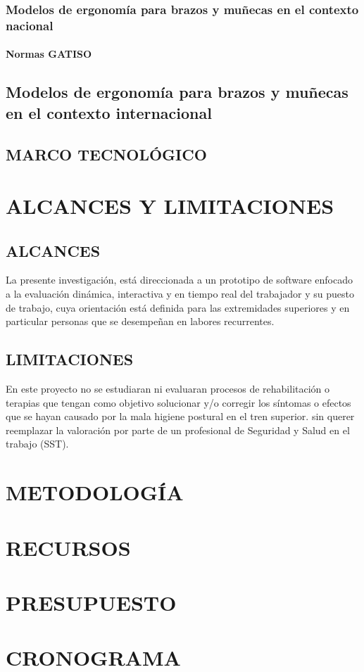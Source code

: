 \subsection{Modelos de ergonomía para brazos y muñecas en el contexto nacional}
\subsubsection{Normas GATISO}
\section{Modelos de ergonomía para brazos y muñecas en el contexto internacional}
\section{MARCO TECNOLÓGICO}
\chapter{ALCANCES Y LIMITACIONES}
\section{ALCANCES}
La presente investigación, está direccionada a un prototipo de software enfocado a  la evaluación dinámica, interactiva y  en tiempo real del trabajador y su puesto de trabajo, cuya orientación está definida para las extremidades superiores y en particular personas que se desempeñan en labores recurrentes. 
\section{LIMITACIONES}
En este proyecto no se estudiaran ni evaluaran procesos de rehabilitación o terapias que tengan como objetivo solucionar y/o corregir los síntomas o efectos que se hayan causado por la mala higiene postural en el tren superior. sin querer reemplazar la valoración por parte de un profesional de Seguridad y Salud en el trabajo (SST).
\chapter{METODOLOGÍA}
\chapter{RECURSOS}
\chapter{PRESUPUESTO}
\chapter{CRONOGRAMA}


\newpage
\printbibliography[heading=bibintoc, title={BIBLIOGRAFÍA}]
    
